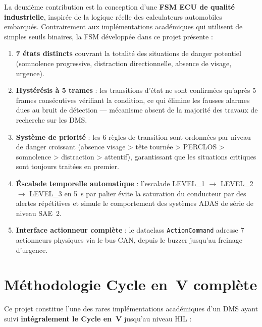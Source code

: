 \documentclass[12pt,a4paper]{report}
\begin{document}
La deuxi\`eme contribution est la conception d'une \textbf{FSM ECU de qualit\'e industrielle}, inspir\'ee de la logique r\'eelle des calculateurs automobiles embarqu\'es. Contrairement aux impl\'ementations acad\'emiques qui utilisent de simples seuils binaires, la FSM d\'evelopp\'ee dans ce projet pr\'esente :

\begin{enumerate}
  \item \textbf{7 \'etats distincts} couvrant la totalit\'e des situations de danger potentiel (somnolence progressive, distraction directionnelle, absence de visage, urgence).
  \item \textbf{Hyst\'er\'esis \`a 5 trames} : les transitions d'\'etat ne sont confirm\'ees qu'apr\`es 5 frames cons\'ecutives v\'erifiant la condition, ce qui \'elimine les fausses alarmes dues au bruit de d\'etection — m\'ecanisme absent de la majorit\'e des travaux de recherche sur les DMS.
  \item \textbf{Syst\`eme de priorit\'e} : les 6 r\`egles de transition sont ordonn\'ees par niveau de danger croissant (absence visage > t\^ete tourn\'ee > PERCLOS > somnolence > distraction > attentif), garantissant que les situations critiques sont toujours trait\'ees en premier.
  \item \textbf{\'Escalade temporelle automatique} : l'escalade LEVEL\_1 $\to$ LEVEL\_2 $\to$ LEVEL\_3 en 5~s par palier \'evite la saturation du conducteur par des alertes r\'ep\'etitives et simule le comportement des syst\`emes ADAS de s\'erie de niveau SAE~2.
  \item \textbf{Interface actionneur compl\`ete} : le dataclass \texttt{ActionCommand} adresse 7 actionneurs physiques via le bus CAN, depuis le buzzer jusqu'au freinage d'urgence.
\end{enumerate}

\section{M\'ethodologie Cycle en~V compl\`ete}

Ce projet constitue l'une des rares impl\'ementations acad\'emiques d'un DMS ayant suivi \textbf{int\'egralement le Cycle en~V} jusqu'au niveau HIL :
\end{document}
